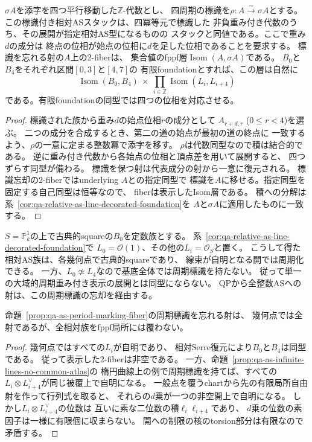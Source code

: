 \begin{proposition}[周期を忘れる射のfiberと周期化の障害]
\label{prop:qa-as-period-marking-fiber}
$\sigma A$を添字を四つ平行移動した$\mathbb Z$-代数とし、
四周期の標識を$\rho:A\xrightarrow{\sim}\sigma A$とする。
この標識付き相対ASスタックは、四冪等元で標識した
非負重み付き代数のうち、その展開が指定相対AS型になるものの
スタックと同値である。ここで重み$d$の成分は
終点の位相が始点の位相に$d$を足した位相であることを要求する。
標識を忘れる射の$A$上の2-fiberは、
集合値のfppf層$\operatorname{Isom}(A,\sigma A)$である。
$B_0$と$B_4$をそれぞれ区間$[0,3]$と$[4,7]$の
有限foundationとすれば、この層は自然に
\[
 \operatorname{Isom}(B_0,B_4)\ \times\
 \prod_{i\in\mathbb Z}\operatorname{Isom}(L_i,L_{i+4})
\]
である。有限foundationの同型では四つの位相を対応させる。
\end{proposition}
\begin{proof}
標識された族から重み$d$の始点位相$r$の成分として
$A_{r+d,r}$ ($0\le r<4$)を選ぶ。
二つの成分を合成するとき、第二の道の始点が最初の道の終点に
一致するよう、$\rho$の一意に定まる整数冪で添字を移す。
$\rho$は代数同型なので積は結合的である。
逆に重み付き代数から各始点の位相と頂点差を用いて展開すると、
四つずらす同型が備わる。
標識を保つ射は代表成分の射から一意に復元される。
標識忘却の2-fiberではunderlying $A$との指定同型で
標識を$A$に移せる。指定同型を固定する自己同型は恒等なので、
fiberは表示したIsom層である。
積への分解は系~\ref{cor:qa-relative-as-line-decorated-foundation}を
$A$と$\sigma A$に適用したものに一致する。
\end{proof}

\begin{example}[周期標識の大域障害]
$S=\mathbb P^1_k$の上で古典的squareの$B_0$を定数族とする。
系~\ref{cor:qa-relative-as-line-decorated-foundation}で
$L_0=\mathcal O(1)$、その他の$L_i=\mathcal O_S$と置く。
こうして得た相対AS族は、各幾何点で古典的squareであり、
線束が自明となる開では周期化できる。
一方、$L_0\not\simeq L_4$なので基底全体では周期標識を持たない。
従って単一の大域的周期重み付き表示の展開とは同型にならない。
QPから全整数ASへの射は、この周期標識の忘却を経由する。
\end{example}

\begin{corollary}[周期標識をfppf局所にも持たない族]
\label{cor:qa-as-period-no-common-local-marking}
命題~\ref{prop:qa-as-period-marking-fiber}の周期標識を忘れる射は、
幾何点では全射であるが、全相対族をfppf局所には覆わない。
\end{corollary}
\begin{proof}
幾何点ではすべての$L_i$が自明であり、
相対Serre復元により$B_0$と$B_4$は同型である。
従って表示した2-fiberは非空である。
一方、命題~\ref{prop:qa-as-infinite-lines-no-common-atlas}の
楕円曲線上の例で周期標識を持てば、すべての
$L_i\otimes L_{i+4}^\vee$が同じ被覆上で自明になる。
一般点を覆うchartから先の有限局所自由射を作って行列式を取ると、
それらの$d$乗が一つの非空開上で自明になる。
しかし$L_i\otimes L_{i+4}^\vee$の位数は
互いに素な二位数の積$\ell_i\ell_{i+4}$であり、
$d$乗の位数の素因子は一様に有限個に収まらない。
開への制限の核のtorsion部分は有限なので矛盾する。
\end{proof}

